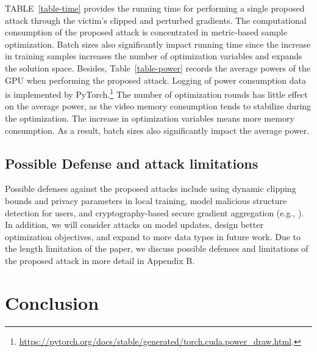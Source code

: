 \documentclass[lettersize,journal]{IEEEtran}
\begin{document}
TABLE~\ref{table-time} provides the running time for performing a single proposed attack through the victim's clipped and perturbed gradients. The computational consumption of the proposed attack is concentrated in metric-based sample optimization. Batch sizes also significantly impact running time since the increase in training samples increases the number of optimization variables and expands the solution space. Besides, Table~\ref{table-power} records the average powers of the GPU when performing the proposed attack. Logging of power consumption data is implemented by PyTorch.\footnote{\url{https://pytorch.org/docs/stable/generated/torch.cuda.power_draw.html}.} The number of optimization rounds has little effect on the average power, as the video memory consumption tends to stabilize during the optimization. The increase in optimization variables means more memory consumption. As a result, batch sizes also significantly impact the average power.

\subsection{Possible Defense and attack limitations}

Possible defenses against the proposed attacks include using dynamic clipping bounds and privacy parameters in local training, model malicious structure detection for users, and cryptography-based secure gradient aggregation (e.g., \cite{Nguyen2024Preserving,Song2023lsecnet}). In addition, we will consider attacks on model updates, design better optimization objectives, and expand to more data types in future work.
Due to the length limitation of the paper, we discuss possible defenses and limitations of the proposed attack in more detail in Appendix B.

\section{Conclusion}
\end{document}
